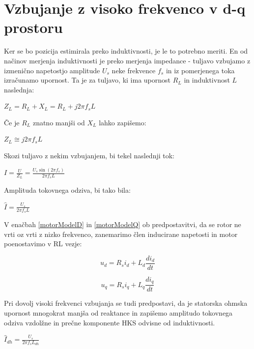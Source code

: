 \documentclass[a4paper,twoside,openright,12pt,slovene]{book}
\begin{document}
\section{Vzbujanje z visoko frekvenco v d-q prostoru}
Ker se bo pozicija estimirala preko induktivnosti, je le to potrebno meriti. En od načinov merjenja induktivnosti je preko merjenja impedance - tuljavo vzbujamo z izmenično napetostjo amplitude $U_s$
neke frekvence $f_s$ in iz pomerjenega toka izračunamo upornost. Ta je za tuljavo, ki ima upornost $R_L$ in induktivnost $L$ naslednja:

\begin{center}
    $Z_L = R_L + X_L = R_L + j2\pi f_sL$
\end{center}

Če je $R_L$ znatno manjši od $X_L$ lahko zapišemo:

\begin{center}
    $Z_L \cong j2\pi f_sL$
\end{center}

Skozi tuljavo z nekim vzbujanjem, bi tekel naslednji tok:

\begin{center}
    $I = \frac{U}{Z_L} = \frac{U_s \sin{(2\pi f_s)}}{2\pi f_sL}$
\end{center}

Amplituda tokovnega odziva, bi tako bila:

\begin{center}
    $\hat{I} = \frac{U_s}{2\pi f_sL}$
\end{center}

V enačbah \ref{motorModelD} in \ref{motorModelQ} ob predpostavitvi, da se rotor ne vrti oz vrti z nizko frekvenco, zanemarimo člen inducirane napetosti in motor poenostavimo v RL vezje:

\begin{equation} \label{motorModelD}
    u_d = R_si_d+L_d\frac{di_d}{dt}
\end{equation}

\begin{equation} \label{motorModelQ}
    u_q = R_si_q+L_q\frac{di_q}{dt}
\end{equation}

Pri dovolj visoki frekvenci vzbujanja se tudi predpostavi, da je statorska ohmska upornost mnogokrat manjša od reaktance in zapišemo amplitudo tokovnega odziva vzdolžne in prečne komponente HKS
odvisne od induktivnosti.

\begin{center}
    $\hat{I}_{dh} = \frac{U_s}{2\pi f_sL_{dh}}$
\end{center}
\end{document}
